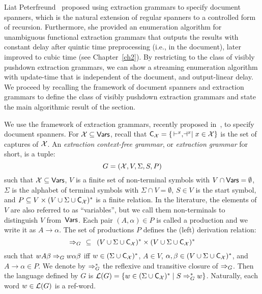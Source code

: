 
Liat Peterfreund~\cite{liatpaper} proposed using extraction grammars to specify document spanners, which is the natural extension of regular spanners to a controlled form of recursion. Furthermore, she provided an enumeration algorithm for unambiguous functional extraction grammars that outputs the results with constant delay after quintic time preprocessing (i.e., in the document), later improved to cubic time (see Chapter~\ref{ch2}). By restricting to the class of visibly pushdown extraction grammars, we can show a streaming enumeration algorithm with update-time that is independent of the document, and output-linear delay. We proceed by recalling the framework of document spanners and extraction grammars to define the class of visibly pushdown extraction grammars and state the main algorithmic result of the section. 


We use the framework of extraction grammars, recently proposed in~\cite{liatpaper}, to specify document spanners. 
For $\mathcal{X} \subseteq \mathsf{Vars}$, recall that $\textsf{C}_{\mathcal{X}} = \{\, \vdash^{x}, \!\dashv^{x}\mid x\in \mathcal{X}\}$ is the set of captures of $\mathcal{X}$.
An \emph{extraction context-free grammar}, or \emph{extraction grammar} for short, is a tuple:
\[
G = (\mathcal{X}, V, \Sigma, S, P)
\] 
such that $\mathcal{X} \subseteq \mathsf{Vars}$, $V$ is a finite set of non-terminal symbols with $V\cap \mathsf{Vars} = \emptyset$, $\Sigma$ is the alphabet of terminal symbols with $\Sigma \cap V = \emptyset$, $S \in V$ is the start symbol, and $P \subseteq V \times (V \cup \Sigma \cup \textsf{C}_{\mathcal{X}})^*$ is a finite relation. In the literature, the elements of $V$ are also referred to as ``variables'', but we call them non-terminals to distinguish $V$ from~$\mathsf{Vars}$.
Each pair $(A, \alpha) \in P$ is called a production and we write it as $A \rightarrow \alpha$. The set of productions $P$ defines the (left) derivation relation:
\[
\Rightarrow_{G} \ \ \subseteq \ \, (V \cup \Sigma \cup \textsf{C}_{\mathcal{X}})^* \times (V \cup \Sigma \cup \textsf{C}_{\mathcal{X}})^*
\] 
such that $w A \beta \Rightarrow_{G} w \alpha \beta$ iff $w \in (\Sigma \cup \textsf{C}_{\mathcal{X}})^*$, $A \in V$, $\alpha, \beta \in (V \cup \Sigma \cup \textsf{C}_{\mathcal{X}})^*$, and $A \rightarrow \alpha \in P$. We denote by $\Rightarrow_{G}^*$ the reflexive and transitive closure of $\Rightarrow_{G}$. Then the language defined by $G$ is $\mathcal{L}(G) = \{w \in (\Sigma \cup \textsf{C}_{\mathcal{X}})^* \mid S \Rightarrow_{G}^* w\}$. 
Naturally, each word $w \in \mathcal{L}(G)$ is a ref-word.

